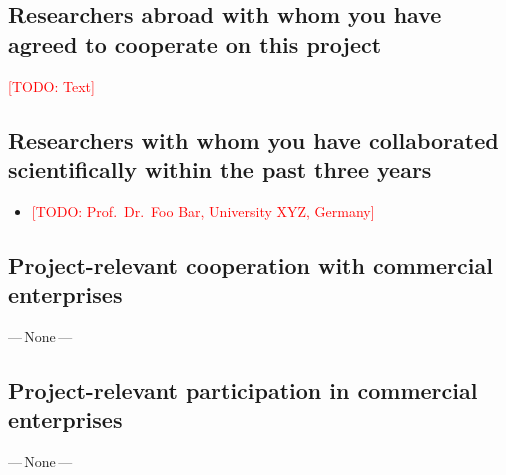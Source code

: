 \documentclass[american,firsttime]{dfgproposal}
\newcommand{\todo}[1]{\xspace{\textcolor{red}{[TODO: #1]}}\xspace}
\begin{document}
	\subsection{Researchers abroad with whom you have agreed to cooperate on this project}
	\todo{Text}
	
	\subsection{Researchers with whom you have collaborated scientifically within the past three years}
	\begin{itemize}
		\item \todo{Prof.~Dr.~Foo Bar, University XYZ, Germany}
	\end{itemize}
	
	\subsection{Project-relevant cooperation with commercial enterprises}
	---\,None\,---
	
	\subsection{Project-relevant participation in commercial enterprises}
	---\,None\,---
	
\end{document}
